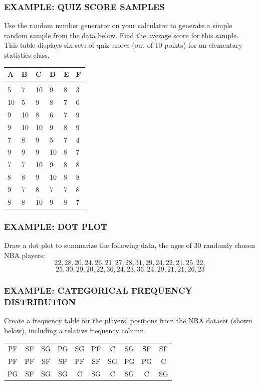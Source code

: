 \documentclass[8pt]{beamer}
\newcommand{\extitle}[1]{\frametitle{\fontfamily{fvs}\selectfont \small\color{black!70!blue!80!cyan}\uppercase{\bfseries Example: #1}}}
\def\solblank{\begin{tcolorbox}[colframe=black!50!blue!50!cyan,
colback=white,
bottomrule=0mm,
rightrule=0mm,
sharp corners=all] 
\vspace{6in}
\text{}
\end{tcolorbox}}
\begin{document}
\begin{frame}
\extitle{Quiz Score Samples}
Use the random number generator on your calculator to generate a simple random sample from the data below.  Find the average score for this sample.\\

This table displays six sets of quiz scores (out of 10 points) for an elementary statistics class.
\begin{center}
\begin{tabular}{l l l l l l}
A & B & C & D & E & F\\
\hline
& & & & & \\
5 & 7 & 10 & 9 & 8 & 3\\
10 & 5 & 9 & 8 & 7 & 6\\
9 & 10 & 8 & 6 & 7 & 9\\
9 & 10 & 10 & 9 & 8 & 9\\
7 & 8 & 9 & 5 & 7 & 4\\
9 & 9 & 9 & 10 & 8 & 7\\
7 & 7 & 10 & 9 & 8 & 8\\
8 & 8 & 9 & 10 & 8 & 8\\
9 & 7 & 8 & 7 & 7 & 8\\
8 & 8 & 10 & 9 & 8 & 7\\
\end{tabular}
\end{center}

\solblank
\end{frame}

\begin{frame}
\extitle{Dot Plot}
Draw a dot plot to summarize the following data, the ages of 30 randomly chosen NBA players:
\[22, 28, 20, 24, 26, 21, 27, 28, 31, 29, 24, 22, 21, 25, 22,\]
\[25, 30, 29, 20, 22, 36, 24, 23, 36, 24, 29, 21, 21, 26, 23\]

\solblank
\end{frame}

\begin{frame}
\extitle{Categorical Frequency Distribution}
Create a frequency table for the players' positions from the NBA dataset (shown below), including a relative frequency column.
\begin{center}
\begin{tabular}{c c c c c c c c c c}
PF & SF & SG & PG & SG & PF & C & SG & SF & SF\\
PF & PF & SF & SF & PF & SF & SG & PG & PG & C\\
PG & SF & SG & SG & C & SG & C & SG & C & SG
\end{tabular}
\end{center}

\solblank
\end{frame}
\end{document}
